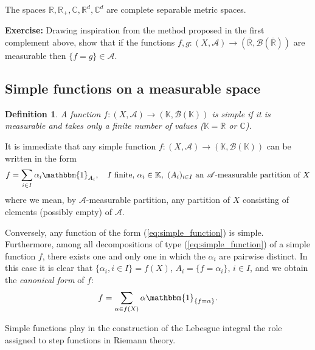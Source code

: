 \documentclass[12pt]{article}
\theoremstyle{definition}
\newtheorem{definition}{Definition}[section]
\begin{document}
\begin{itemize}
The spaces $\mathbb{R}, \mathbb{R}_+, \mathbb{C}, \mathbb{R}^d, \mathbb{C}^d$ are complete separable metric spaces.
\end{itemize}

\textbf{Exercise:} Drawing inspiration from the method proposed in the first complement above, show that if the functions $f, g : (X, \mathscr{A}) \to (\overline{\mathbb{R}}, \mathscr{B}(\overline{\mathbb{R}}))$ are measurable then $\{f = g\} \in \mathscr{A}$.

\subsection{Simple functions on a measurable space}

\begin{definition}
\textit{A function $f : (X, \mathscr{A}) \to (\mathbb{K}, \mathscr{B}(\mathbb{K}))$ is simple if it is measurable and takes only a finite number of values ($\mathbb{K} = \mathbb{R}$ or $\mathbb{C}$).}
\end{definition}

It is immediate that any simple function $f : (X, \mathscr{A}) \to (\mathbb{K}, \mathscr{B}(\mathbb{K}))$ can be written in the form
\begin{equation}\label{eq:simple_function}
f = \sum_{i \in I} \alpha_i \mathbbm{1}_{A_i}, \quad I \text{ finite, } \alpha_i \in \mathbb{K}, \ (A_i)_{i \in I} \text{ an } \mathscr{A}\text{-measurable partition of } X 
\end{equation}
where we mean, by $\mathscr{A}$-measurable partition, any partition of $X$ consisting of elements (possibly empty) of $\mathscr{A}$.

Conversely, any function of the form (\ref{eq:simple_function}) is simple. Furthermore, among all decompositions of type (\ref{eq:simple_function}) of a simple function $f$, there exists one and only one in which the $\alpha_i$ are pairwise distinct. In this case it is clear that $\{\alpha_i, i \in I\} = f(X)$, $A_i = \{f = \alpha_i\}$, $i \in I$, and we obtain the \textit{canonical form} of $f$:
$$ f = \sum_{\alpha \in f(X)} \alpha \mathbbm{1}_{\{f = \alpha\}}. $$

Simple functions play in the construction of the Lebesgue integral the role assigned to step functions in Riemann theory.
\end{document}
